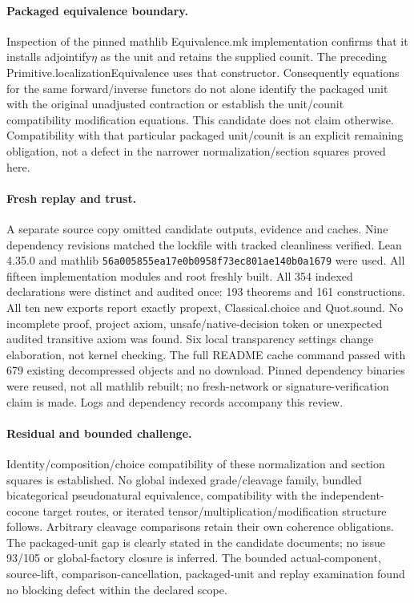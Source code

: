 \documentclass{article}
\begin{document}
\paragraph{Packaged equivalence boundary.} Inspection of the pinned mathlib Equivalence.mk implementation confirms that it installs adjointify\ensuremath{\eta} as the unit and retains the supplied counit. The preceding Primitive.localizationEquivalence uses that constructor. Consequently equations for the same forward/inverse functors do not alone identify the packaged unit with the original unadjusted contraction or establish the unit/counit compatibility modification equations. This candidate does not claim otherwise. Compatibility with that particular packaged unit/counit is an explicit remaining obligation, not a defect in the narrower normalization/section squares proved here.
\paragraph{Fresh replay and trust.} A separate source copy omitted candidate outputs, evidence and caches. Nine dependency revisions matched the lockfile with tracked cleanliness verified. Lean 4.35.0 and mathlib \texttt{56a005855ea17e0b0958f73ec801ae140b0a1679} were used. All fifteen implementation modules and root freshly built. All 354 indexed declarations were distinct and audited once: 193 theorems and 161 constructions. All ten new exports report exactly propext, Classical.choice and Quot.sound. No incomplete proof, project axiom, unsafe/native-decision token or unexpected audited transitive axiom was found. Six local transparency settings change elaboration, not kernel checking. The full README cache command passed with 679 existing decompressed objects and no download. Pinned dependency binaries were reused, not all mathlib rebuilt; no fresh-network or signature-verification claim is made. Logs and dependency records accompany this review.
\paragraph{Residual and bounded challenge.} Identity/composition/choice compatibility of these normalization and section squares is established. No global indexed grade/cleavage family, bundled bicategorical pseudonatural equivalence, compatibility with the independent-cocone target routes, or iterated tensor/multiplication/modification structure follows. Arbitrary cleavage comparisons retain their own coherence obligations. The packaged-unit gap is clearly stated in the candidate documents; no issue 93/105 or global-factory closure is inferred. The bounded actual-component, source-lift, comparison-cancellation, packaged-unit and replay examination found no blocking defect within the declared scope.
\end{document}
